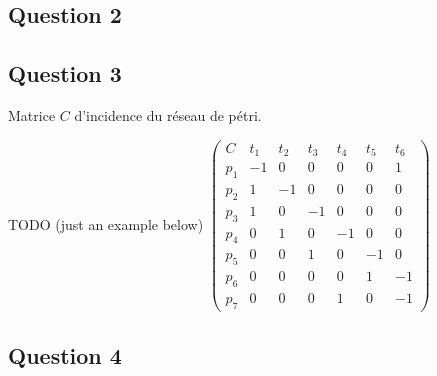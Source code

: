 \subsection*{Question 2}
\subsection*{Question 3}

Matrice $C$ d'incidence du réseau de pétri.

TODO (just an example below)
 $ \begin{pmatrix}
C&t_1&t_2&t_3&t_4&t_5&t_6 \\
p_1& -1&0&0&0&0&1 \\
p_2&1&-1&0&0&0&0 \\
p_3&1&0&-1&0&0&0 \\
p_4&0&1&0&-1&0&0 \\
p_5&0&0&1&0&-1&0 \\
p_6&0&0&0&0&1&-1 \\
p_7&0&0&0&1&0&-1 
\end{pmatrix}$
\subsection*{Question 4}
